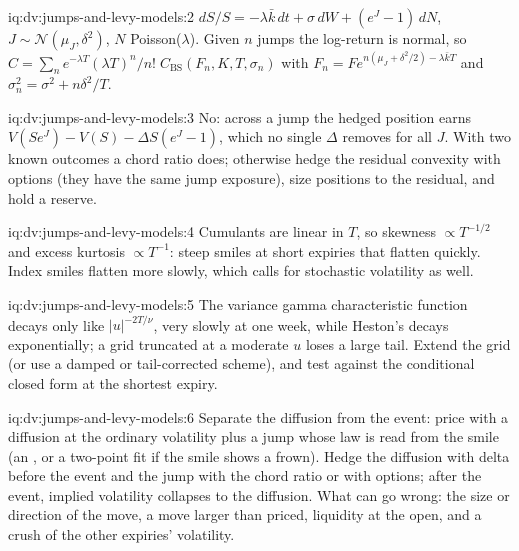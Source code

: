 \begin{solution}{iq:dv:jumps-and-levy-models:2}
$dS/S=-\lambda\bar k\,dt+\sigma\,dW+(e^J-1)\,dN$, $J\sim\mathcal N(\mu_J,\delta^2)$, $N$ Poisson($\lambda$). Given $n$
jumps the log-return is normal, so $C=\sum_n e^{-\lambda T}(\lambda T)^n/n!\;C_{\mathrm{BS}}(F_n,K,T,\sigma_n)$ with
$F_n=Fe^{n(\mu_J+\delta^2/2)-\lambda\bar kT}$ and $\sigma_n^2=\sigma^2+n\delta^2/T$.
\end{solution}

\begin{solution}{iq:dv:jumps-and-levy-models:3}
No: across a jump the hedged position earns $V(Se^J)-V(S)-\Delta S(e^J-1)$, which no single $\Delta$ removes for
all $J$. With two known outcomes a chord ratio does; otherwise hedge the residual convexity with options (they have
the same jump exposure), size positions to the residual, and hold a reserve.
\end{solution}

\begin{solution}{iq:dv:jumps-and-levy-models:4}
Cumulants are linear in $T$, so skewness $\propto T^{-1/2}$ and excess kurtosis $\propto T^{-1}$: steep smiles at
short expiries that flatten quickly. Index smiles flatten more slowly, which calls for stochastic volatility as well.
\end{solution}

\begin{solution}{iq:dv:jumps-and-levy-models:5}
The variance gamma characteristic function decays only like $|u|^{-2T/\nu}$, very slowly at one week, while Heston's
decays exponentially; a grid truncated at a moderate $u$ loses a large tail. Extend the grid (or use a damped or
tail-corrected scheme), and test against the conditional closed form at the shortest expiry.
\end{solution}

\begin{solution}{iq:dv:jumps-and-levy-models:6}
Separate the diffusion from the event: price with a diffusion at the ordinary volatility plus a jump whose law is read
from the smile (an , or a two-point fit if the smile shows a frown). Hedge the diffusion with delta
before the event and the jump with the chord ratio or with options; after the event, implied volatility collapses to
the diffusion. What can go wrong: the size or direction of the move, a move larger than priced, liquidity at the open,
and a crush of the other expiries' volatility.
\end{solution}
